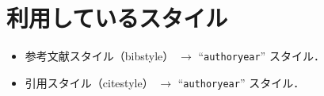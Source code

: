 \documentclass[10pt]{jlreq}
\begin{document}
\section{利用しているスタイル}

\begin{itemize}
 \item 参考文献スタイル（bibstyle） $\rightarrow$ ``\texttt{authoryear}'' スタイル．
 \item 引用スタイル（citestyle） $\rightarrow$ ``\texttt{authoryear}'' スタイル．
\end{itemize}


\end{document}
